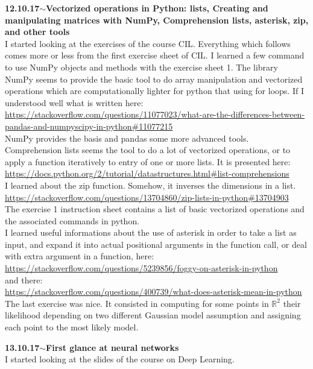 \documentclass[11pt,a4paper]{article}
\newenvironment{loggentry}[2]%
{\noindent\textbf{#1}\hspace{1cm}$\mathbf{\sim}$\text{ }\textbf{#2}\\}{\vspace{0.5cm}}
\newcommand{\R}{\mathbb{R}}
\begin{document}
\begin{loggentry}{12.10.17}{Vectorized operations in Python: lists, Creating and manipulating matrices with NumPy, Comprehension lists, asterisk, zip, and other tools}
I started looking at the exercises of the course CIL. Everything which follows comes more or less from the first exercise sheet of CIL. I learned a few command to use NumPy objects and methods with the exercise sheet 1.
The library NumPy seems to provide the basic tool to do array manipulation and vectorized operations which are computationally lighter for python that using for loops. If I understood well what is written here:\\
\url{https://stackoverflow.com/questions/11077023/what-are-the-differences-between-pandas-and-numpyscipy-in-python#11077215}\\
NumPy provides the basis and pandas some more advanced tools.\\
Comprehension lists seems the tool to do a lot of vectorized operations, or to apply a function iteratively to entry of one or more lists. It is presented here:\\
\url{https://docs.python.org/2/tutorial/datastructures.html#list-comprehensions}\\
I learned about the zip function. Somehow, it inverses the dimensions in a list. 
\url{https://stackoverflow.com/questions/13704860/zip-lists-in-python#13704903}\\
The exercise 1 instruction sheet contains a list of basic vectorized operations and the associated commands in python.\\
I learned useful informations about the use of asterisk in order to take a list as input, and expand it into actual positional arguments in the function call, or deal with extra argument in a function, here:\\
\url{https://stackoverflow.com/questions/5239856/foggy-on-asterisk-in-python}\\
and there:\\
\url{https://stackoverflow.com/questions/400739/what-does-asterisk-mean-in-python}\\
The last exercise was nice. It consisted in computing for some points in $\R^2$ their likelihood depending on two different Gaussian model assumption and assigning each point to the most likely model.
\end{loggentry}

\begin{loggentry}{13.10.17}{First glance at neural networks}
I started looking at the slides of the course on Deep Learning. 
\end{loggentry}
\end{document}
